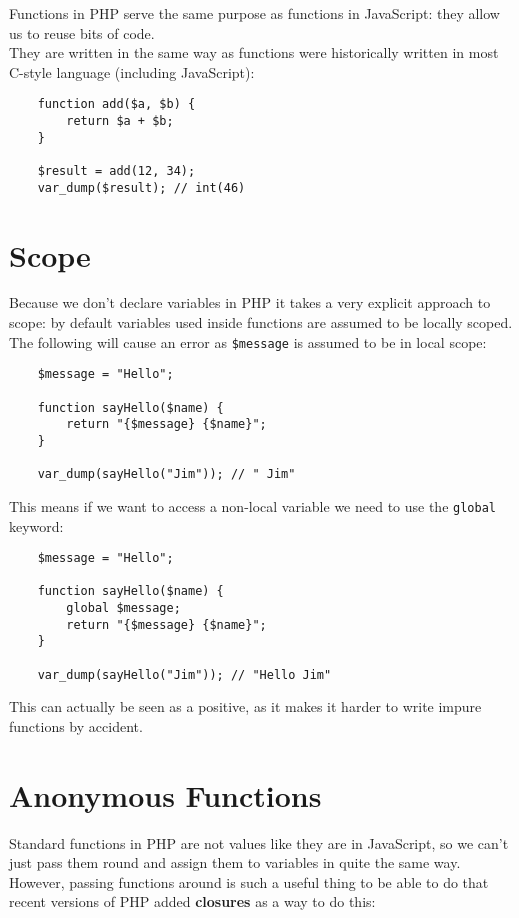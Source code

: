 Functions in PHP serve the same purpose as functions in JavaScript: they allow us to reuse bits of code.
\\

They are written in the same way as functions were historically written in most C-style language (including JavaScript):

\begin{verbatim}
    function add($a, $b) {
        return $a + $b;
    }

    $result = add(12, 34);
    var_dump($result); // int(46)
\end{verbatim}


\section{Scope}

Because we don't declare variables in PHP it takes a very explicit approach to scope: by default variables used inside functions are assumed to be locally scoped.
\\

The following will cause an error as \texttt{\$message} is assumed to be in local scope:

\begin{verbatim}
    $message = "Hello";

    function sayHello($name) {
        return "{$message} {$name}";
    }

    var_dump(sayHello("Jim")); // " Jim"
\end{verbatim}

This means if we want to access a non-local variable we need to use the \texttt{global} keyword:

\begin{verbatim}
    $message = "Hello";

    function sayHello($name) {
        global $message;
        return "{$message} {$name}";
    }

    var_dump(sayHello("Jim")); // "Hello Jim"
\end{verbatim}

This can actually be seen as a positive, as it makes it harder to write impure functions by accident.


\section{Anonymous Functions}

Standard functions in PHP are not values like they are in JavaScript, so we can't just pass them round and assign them to variables in quite the same way. However, passing functions around is such a useful thing to be able to do that recent versions of PHP added \textbf{closures} as a way to do this:

